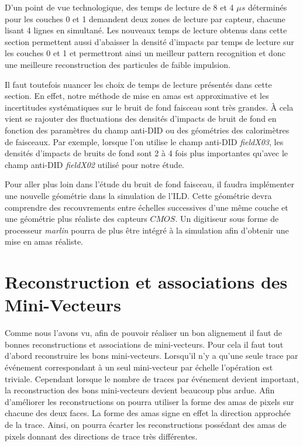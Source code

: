    D'un point de vue technologique, des temps de lecture de 8 et 4 $\mu s$ d\'etermin\'es pour les couches 0 et 1 demandent deux zones de lecture par capteur, chacune lisant 4 lignes en simultan\'e. Les nouveaux temps de lecture obtenus dans cette section permettent aussi d'abaisser la densit\'e d'impacts par temps de lecture sur les couches 0 et 1 et permettront ainsi un meilleur pattern recognition et donc une meilleure reconstruction des particules de faible impulsion.
   
   \medskip
   
   Il faut toutefois nuancer les choix de temps de lecture pr\'esent\'es dans cette section. En effet, notre m\'ethode de mise en amas est approximative et les incertitudes syst\'ematiques sur le bruit de fond faisceau sont tr\`es grandes. \`A cela vient se rajouter des fluctuations des densit\'es d'impacts de bruit de fond en fonction des param\`etres du champ anti-DID ou des g\'eom\'etries des calorim\`etres de faisceaux. Par exemple, lorsque l'on utilise le champ  anti-DID \textit{fieldX03}, les densit\'es d'impacts de bruits de fond sont 2 \`a 4 fois plus importantes qu'avec le champ anti-DID \textit{fieldX02} utilis\'e pour notre \'etude.
   
   \medskip
   
   Pour aller plus loin dans l'\'etude du bruit de fond faisceau, il faudra impl\'ementer une nouvelle g\'eom\'etrie dans la simulation de l'ILD. Cette g\'eom\'etrie devra comprendre des recouvrements entre \'echelles successives d'une m\^eme couche et une g\'eom\'etrie plus r\'ealiste des capteurs $CMOS$. Un digitiseur sous forme de processeur \textit{marlin} pourra de plus \^etre int\'egr\'e \`a la simulation afin d'obtenir une mise en amas r\'ealiste.
   
   \section{Reconstruction et associations des Mini-Vecteurs}
   \label{sect:reconstructions_associations}
   
   Comme nous l'avons vu, afin de pouvoir r\'ealiser un bon alignement il faut de bonnes reconstructions et associations de mini-vecteurs. Pour cela il faut tout d'abord reconstruire les bons mini-vecteurs. Lorsqu'il n'y a qu'une seule trace par \'ev\'enement correspondant \`a un seul mini-vecteur par \'echelle l'op\'eration est triviale. Cependant lorsque le nombre de traces par \'ev\'enement devient important, la reconstruction des bons mini-vecteurs devient beaucoup plus ardue. Afin d'am\'eliorer les reconstructions on pourra utiliser la forme des amas de pixels sur chacune des deux faces. La forme des amas signe en effet la direction approch\'ee de la trace. Ainsi, on pourra écarter les reconstructions poss\'edant des amas de pixels donnant des directions de trace tr\`es diff\'erentes.
   

